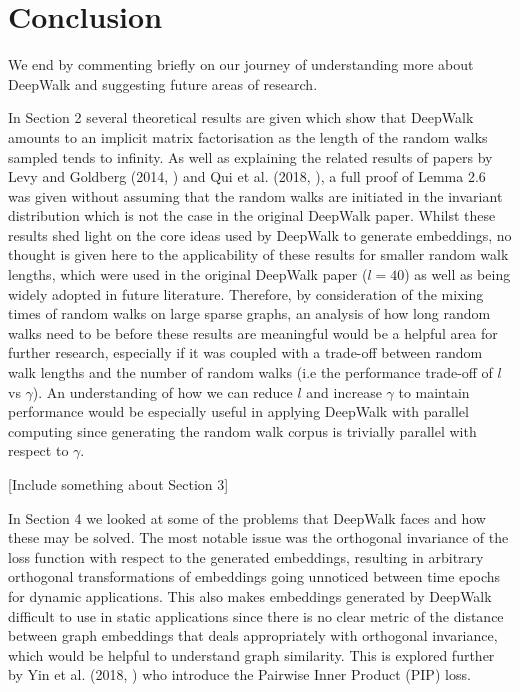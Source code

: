 \documentclass[a4paper]{article}
\begin{document}
\section{Conclusion}
We end by commenting briefly on our journey of understanding more about DeepWalk and suggesting future areas of research.

In Section 2 several theoretical results are given which show that DeepWalk amounts to an implicit matrix factorisation as the length of the random walks sampled tends to infinity.
As well as explaining the related results of papers by Levy and Goldberg (2014, \cite{levy&goldberg}) and  Qui et al. (2018, \cite{qiu2018}), a full proof of Lemma 2.6 was given without assuming that the random walks are initiated in the invariant distribution which is not the case in the original DeepWalk paper.
Whilst these results shed light on the core ideas used by DeepWalk to generate embeddings, no thought is given here to the applicability of these results for smaller random walk lengths, which were used in the original DeepWalk paper ($l = 40$) as well as being widely adopted in future literature. Therefore, by consideration of the mixing times of random walks on large sparse graphs, an analysis of how long random walks need to be before these
results are meaningful would be a helpful area for further research, especially if it was coupled with a trade-off between random walk lengths and the number of random walks (i.e the performance trade-off of $l$ vs $\gamma$). An understanding of how we can reduce $l$ and increase $\gamma$ to maintain performance would be especially useful in applying DeepWalk with parallel computing since generating the random walk corpus is trivially parallel with respect to $\gamma$.

[Include something about Section 3]

In Section 4 we looked at some of the problems that DeepWalk faces and how these may be solved. The most notable issue was the orthogonal invariance of the loss function with respect to the generated embeddings, resulting in arbitrary orthogonal transformations of embeddings going unnoticed
between time epochs for dynamic applications. This also makes embeddings generated by DeepWalk difficult to use in static applications since there is no clear metric of the distance between graph embeddings that deals appropriately with orthogonal invariance, which would be helpful to understand graph similarity. This is explored further by Yin et al. (2018, \cite{yin2018}) who introduce the Pairwise Inner Product (PIP) loss.
\end{document}
